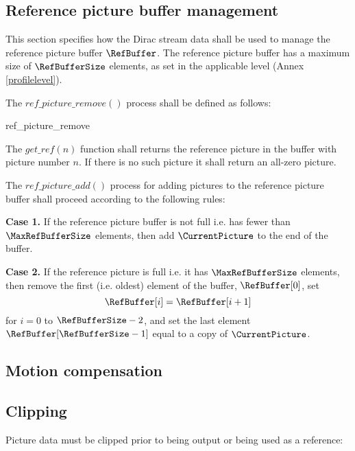 \subsection{Reference picture buffer management}
\label{refbuffer}

This section specifies how the Dirac stream data shall be used to manage the reference 
picture buffer $\RefBuffer$. The reference picture buffer has a maximum size of
$\RefBufferSize$ elements, as set in the applicable level (Annex \ref{profilelevel}).

The $ref\_picture\_remove()$ process shall be defined as
follows:

\begin{pseudo}{ref\_picture\_remove}{}
            \bsCODE{\RefBuffer[j]=\RefBuffer[j+1]}
        \bsEND
    \bsEND
\bsEND
\end{pseudo}

The $get\_ref(n)$ function shall returns the reference picture in the buffer with 
picture number $n$.  If there is no such picture it shall return an all-zero picture.

The $ref\_picture\_add()$ process for adding pictures to the reference picture
buffer shall proceed according to the following rules:

{\bf Case 1.} If the reference picture buffer is not full i.e. has fewer than $\MaxRefBufferSize$ elements,
then add $\CurrentPicture$ to the end of the buffer. 

{\bf Case 2.} If the reference picture is full i.e. it has $\MaxRefBufferSize$ elements, then remove the
first (i.e. oldest) element of the buffer, $\RefBuffer[0]$, set
\[\RefBuffer[i] = \RefBuffer[i+1] \]
for $i=0$ to $\RefBufferSize-2$, and set the last element $\RefBuffer[\RefBufferSize-1]$ equal to
a copy of $\CurrentPicture$.



\subsection{Motion compensation}


\subsection{Clipping}
\label{pictureclip}

Picture data must be clipped prior to being output or being
used as a reference:

